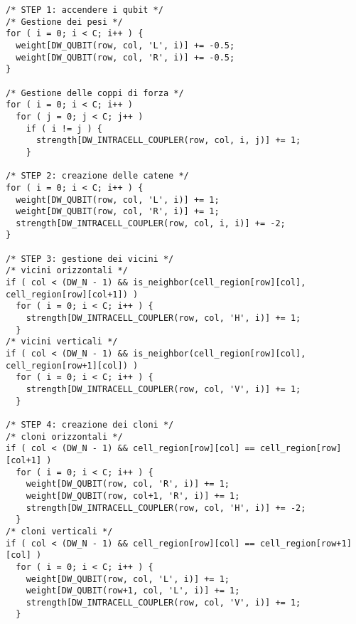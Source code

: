 \lstset{language=C}
\begin{lstlisting}
/* STEP 1: accendere i qubit */
/* Gestione dei pesi */
for ( i = 0; i < C; i++ ) {
  weight[DW_QUBIT(row, col, 'L', i)] += -0.5;
  weight[DW_QUBIT(row, col, 'R', i)] += -0.5;
}

/* Gestione delle coppi di forza */
for ( i = 0; i < C; i++ )
  for ( j = 0; j < C; j++ )
    if ( i != j ) {
      strength[DW_INTRACELL_COUPLER(row, col, i, j)] += 1;
    }

/* STEP 2: creazione delle catene */
for ( i = 0; i < C; i++ ) {
  weight[DW_QUBIT(row, col, 'L', i)] += 1;
  weight[DW_QUBIT(row, col, 'R', i)] += 1;
  strength[DW_INTRACELL_COUPLER(row, col, i, i)] += -2;
}

/* STEP 3: gestione dei vicini */
/* vicini orizzontali */
if ( col < (DW_N - 1) && is_neighbor(cell_region[row][col], cell_region[row][col+1]) )
  for ( i = 0; i < C; i++ ) {
    strength[DW_INTRACELL_COUPLER(row, col, 'H', i)] += 1;
  }
/* vicini verticali */
if ( col < (DW_N - 1) && is_neighbor(cell_region[row][col], cell_region[row+1][col]) )
  for ( i = 0; i < C; i++ ) {
    strength[DW_INTRACELL_COUPLER(row, col, 'V', i)] += 1;
  }

/* STEP 4: creazione dei cloni */
/* cloni orizzontali */
if ( col < (DW_N - 1) && cell_region[row][col] == cell_region[row][col+1] )
  for ( i = 0; i < C; i++ ) {
    weight[DW_QUBIT(row, col, 'R', i)] += 1;
    weight[DW_QUBIT(row, col+1, 'R', i)] += 1;
    strength[DW_INTRACELL_COUPLER(row, col, 'H', i)] += -2;
  }
/* cloni verticali */
if ( col < (DW_N - 1) && cell_region[row][col] == cell_region[row+1][col] )
  for ( i = 0; i < C; i++ ) {
    weight[DW_QUBIT(row, col, 'L', i)] += 1;
    weight[DW_QUBIT(row+1, col, 'L', i)] += 1;
    strength[DW_INTRACELL_COUPLER(row, col, 'V', i)] += 1;
  }
\end{lstlisting}
